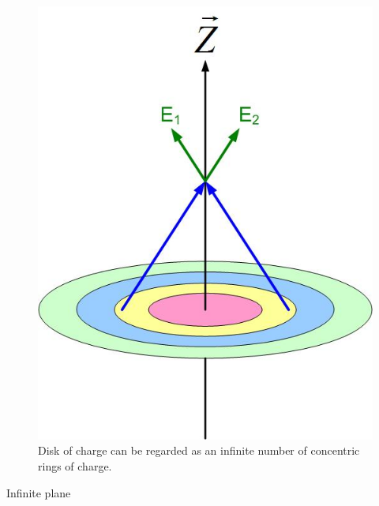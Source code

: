 \documentclass{ximera}
\begin{document}
\begin{figure}[htbp]
\begin{center}
\includegraphics[scale=0.5]{../jpg/surfacedistributiondisk.jpg}
\end{center}
\caption{Disk of charge can be regarded as an infinite number of concentric rings of charge.}
\label{diskcharge}
\end{figure}



Infinite plane
\end{document}
